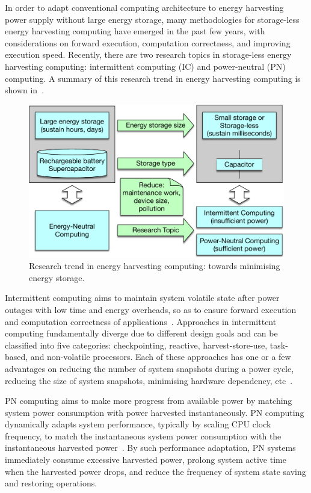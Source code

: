 In order to adapt conventional computing architecture to energy harvesting power supply without large energy storage, many methodologies for storage-less energy harvesting computing have emerged in the past few years, with considerations on forward execution, computation correctness, and improving execution speed. Recently, there are two research topics in storage-less energy harvesting computing: intermittent computing (IC) and power-neutral (PN) computing. A summary of this research trend in energy harvesting computing is shown in~.

\begin{figure}[!htb]
  \centering
  \includegraphics[width=12cm]{figure/intro/paradigm}
  \caption{Research trend in energy harvesting computing: towards minimising energy storage.}
  \label{Figure:paradigm}
\end{figure}

Intermittent computing aims to maintain system volatile state after power outages with low time and energy overheads, so as to ensure forward execution and computation correctness of applications~\cite{ransford2012mementos}. Approaches in intermittent computing fundamentally diverge due to different design goals and can be classified into five categories: checkpointing, reactive, harvest-store-use, task-based, and non-volatile processors. Each of these approaches has one or a few advantages on reducing the number of system snapshots during a power cycle, reducing the size of system snapshots, minimising hardware dependency, etc~\cite{sliper2018enabling}. 

PN computing aims to make more progress from available power by matching system power consumption with power harvested instantaneously. PN computing dynamically adapts system performance, typically by scaling CPU clock frequency, to match the instantaneous system power consumption with the instantaneous harvested power~\cite{balsamo2016graceful, fletcher2017power}. By such performance adaptation, PN systems immediately consume excessive harvested power, prolong system active time when the harvested power drops, and reduce the frequency of system state saving and restoring operations.


